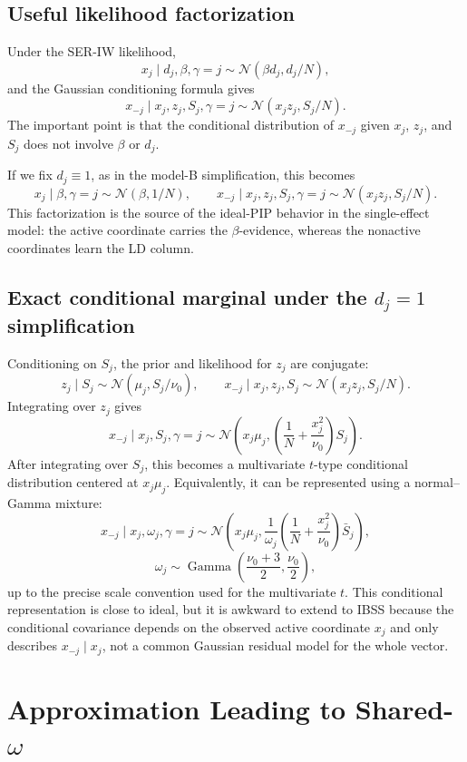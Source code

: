 \documentclass[11pt]{article}
\newcommand{\Normal}{\mathcal N}
\newcommand{\Gam}{\operatorname{Gamma}}
\begin{document}
\subsection{Useful likelihood factorization}

Under the SER-IW likelihood,
\[
x_j\mid d_j,\beta,\gamma=j
\sim
\Normal(\beta d_j,d_j/N),
\]
and the Gaussian conditioning formula gives
\[
x_{-j}\mid x_j,z_j,S_j,\gamma=j
\sim
\Normal(x_jz_j,S_j/N).
\]
The important point is that the conditional distribution of \(x_{-j}\) given
\(x_j\), \(z_j\), and \(S_j\) does not involve \(\beta\) or \(d_j\).

If we fix \(d_j\equiv1\), as in the model-B simplification, this becomes
\[
x_j\mid \beta,\gamma=j
\sim
\Normal(\beta,1/N),
\qquad
x_{-j}\mid x_j,z_j,S_j,\gamma=j
\sim
\Normal(x_jz_j,S_j/N).
\]
This factorization is the source of the ideal-PIP behavior in the
single-effect model: the active coordinate carries the \(\beta\)-evidence,
whereas the nonactive coordinates learn the LD column.

\subsection{\texorpdfstring{Exact conditional marginal under the \(d_j=1\) simplification}{Exact conditional marginal under the d-j equals 1 simplification}}

Conditioning on \(S_j\), the prior and likelihood for \(z_j\) are conjugate:
\[
z_j\mid S_j
\sim
\Normal(\mu_j,S_j/\nu_0),
\qquad
x_{-j}\mid x_j,z_j,S_j
\sim
\Normal(x_jz_j,S_j/N).
\]
Integrating over \(z_j\) gives
\[
x_{-j}\mid x_j,S_j,\gamma=j
\sim
\Normal\left(
x_j\mu_j,
\left(\frac1N+\frac{x_j^2}{\nu_0}\right)S_j
\right).
\]
After integrating over \(S_j\), this becomes a multivariate \(t\)-type
conditional distribution centered at \(x_j\mu_j\). Equivalently, it can be
represented using a normal--Gamma mixture:
\[
x_{-j}\mid x_j,\omega_j,\gamma=j
\sim
\Normal\left(
x_j\mu_j,
\frac{1}{\omega_j}
\left(\frac1N+\frac{x_j^2}{\nu_0}\right)\bar S_j
\right),
\]
\[
\omega_j
\sim
\Gam\left(\frac{\nu_0+3}{2},\frac{\nu_0}{2}\right),
\]
up to the precise scale convention used for the multivariate \(t\). This
conditional representation is close to ideal, but it is awkward to extend to
IBSS because the conditional covariance depends on the observed active
coordinate \(x_j\) and only describes \(x_{-j}\mid x_j\), not a common
Gaussian residual model for the whole vector.

\section{Approximation Leading to Shared-\texorpdfstring{\(\omega\)}{omega}}
\end{document}
